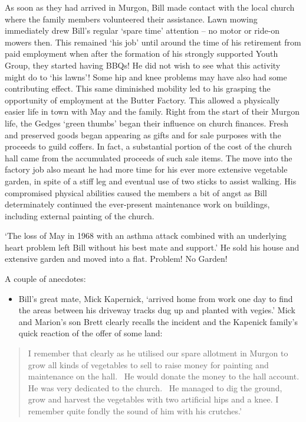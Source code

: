 As soon as they had arrived in Murgon, Bill made contact with the local
church where the family members volunteered their assistance. Lawn
mowing immediately drew Bill's regular `spare time' attention -- no
motor or ride-on mowers then. This remained `his job' until around the
time of his retirement from paid employment when after the formation of
his strongly supported Youth Group, they started having BBQs! He did not
wish to see what this activity might do to `his lawns'! Some hip and
knee problems may have also had some contributing effect. This same
diminished mobility led to his grasping the opportunity of employment at
the Butter Factory. This allowed a physically easier life in town with
May and the family. Right from the start of their Murgon life, the
Gedges `green thumbs' began their influence on church finances. Fresh
and preserved goods began appearing as gifts and for sale purposes with
the proceeds to guild coffers. In fact, a substantial portion of the
cost of the church hall came from the accumulated proceeds of such sale
items. The move into the factory job also meant he had more time for his
ever more extensive vegetable garden, in spite of a stiff leg and
eventual use of two sticks to assist walking. His compromised physical
abilities caused the members a bit of angst as Bill determinately
continued the ever-present maintenance work on buildings, including
external painting of the church.

`The loss of May in 1968 with an asthma attack combined with an
underlying heart problem left Bill without his best mate and support.'
He sold his house and extensive garden and moved into a flat. Problem!
No Garden!

A couple of anecdotes:

\begin{itemize}
\item
  Bill's great mate, Mick Kapernick, `arrived home from work one day to
  find the areas between his driveway tracks dug up and planted with
  vegies.' Mick and Marion's son Brett clearly recalls the incident and
  the Kapenick family's quick reaction of the offer of some land:
\end{itemize}

\begin{quote}
I remember that clearly as he utilised our spare allotment in Murgon to
grow all kinds of vegetables to sell to raise money for painting and
maintenance on the hall.~ He would donate the money to the hall account.
He was very dedicated to the church.~ He managed to dig the ground, grow
and harvest the vegetables with two artificial hips and a knee. I
remember quite fondly the sound of him with his crutches.'
\end{quote}


